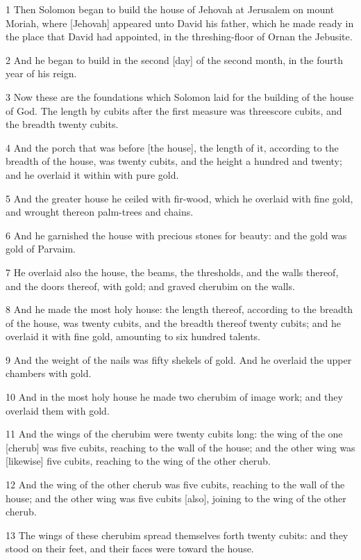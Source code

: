 \par 1 Then Solomon began to build the house of Jehovah at Jerusalem on mount Moriah, where [Jehovah] appeared unto David his father, which he made ready in the place that David had appointed, in the threshing-floor of Ornan the Jebusite.
\par 2 And he began to build in the second [day] of the second month, in the fourth year of his reign.
\par 3 Now these are the foundations which Solomon laid for the building of the house of God. The length by cubits after the first measure was threescore cubits, and the breadth twenty cubits.
\par 4 And the porch that was before [the house], the length of it, according to the breadth of the house, was twenty cubits, and the height a hundred and twenty; and he overlaid it within with pure gold.
\par 5 And the greater house he ceiled with fir-wood, which he overlaid with fine gold, and wrought thereon palm-trees and chains.
\par 6 And he garnished the house with precious stones for beauty: and the gold was gold of Parvaim.
\par 7 He overlaid also the house, the beams, the thresholds, and the walls thereof, and the doors thereof, with gold; and graved cherubim on the walls.
\par 8 And he made the most holy house: the length thereof, according to the breadth of the house, was twenty cubits, and the breadth thereof twenty cubits; and he overlaid it with fine gold, amounting to six hundred talents.
\par 9 And the weight of the nails was fifty shekels of gold. And he overlaid the upper chambers with gold.
\par 10 And in the most holy house he made two cherubim of image work; and they overlaid them with gold.
\par 11 And the wings of the cherubim were twenty cubits long: the wing of the one [cherub] was five cubits, reaching to the wall of the house; and the other wing was [likewise] five cubits, reaching to the wing of the other cherub.
\par 12 And the wing of the other cherub was five cubits, reaching to the wall of the house; and the other wing was five cubits [also], joining to the wing of the other cherub.
\par 13 The wings of these cherubim spread themselves forth twenty cubits: and they stood on their feet, and their faces were toward the house.
